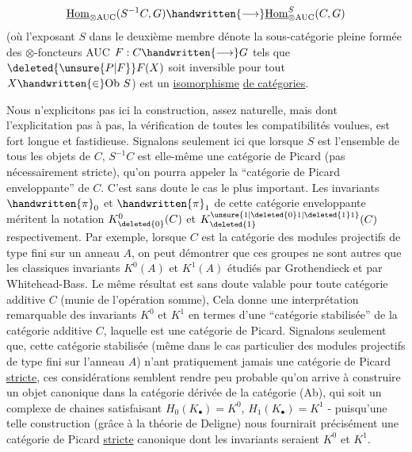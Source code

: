 \[
\underline{\mathrm{Hom}}_{\otimes\mathrm{AUC}}(S^{-1}C,G)\handwritten{\longrightarrow}\underline{\mathrm{Hom}}_{\otimes\mathrm{AUC}}^{S}(C,G)
\]
(où l'exposant $S$ dans le deuxième membre dénote la sous-catégorie pleine formée des $\otimes$-foncteurs AUC $F:C\handwritten{\longrightarrow}G$ tels que $\deleted{\unsure{P|F}}F(X)$ soit inversible pour tout $X\handwritten{\in}\mathrm{Ob}\ S$) est un \uline{isomorphisme} \uline{de catégories}.

Nous n'explicitons pas ici la construction, assez naturelle, mais dont l'explicitation pas à pas,  la vérification de toutes les compatibilités voulues, est fort longue et fastidieuse. Signalons seulement ici que lorsque $S$ est l'ensemble de tous les objets de $C$, $S^{-1}C$ est elle-même une catégorie de Picard (pas nécessairement stricte), qu'on pourra appeler la ``catégorie de Picard enveloppante'' de $C$. C'est sans doute le cas le plus important. Les invariants $\handwritten{\pi}_{0}$ et $\handwritten{\pi}_{1}$ de cette catégorie enveloppante méritent la notation $K^{0}_{\deleted{0}}(C)$ et $K^{\unsure{1|\deleted{0}1|\deleted{1}1}}_{\deleted{1}}(C)$ respectivement. Par exemple, lorsque $C$ est la catégorie des modules projectifs de type fini sur un anneau $A$,  on peut démontrer que ces groupes ne sont autres que les classiques invariants $K^{0}(A)$ et $K^{1}(A)$ étudiés par Grothendieck et par Whitehead-Bass. Le même résultat est sans doute valable pour toute catégorie additive $C$ (munie de  l'opération somme), Cela donne une interprétation remarquable des invariants $K^{0}$ et $K^{1}$ en termes d'une ``catégorie stabilisée'' \handwritten{(}de la catégorie additive $C$\handwritten{)}, laquelle est une catégorie de Picard. Signalons seulement que, cette catégorie stabilisée (même dans le cas particulier des modules projectifs de type fini sur l'anneau $A$) n'ant pratiquement jamais une catégorie de Picard \uline{stricte}, ces considérations semblent rendre peu probable qu'on arrive à construire un objet canonique dans la catégorie dérivée de la catégorie (Ab), qui soit un complexe de chaines satisfaisant $H_{0}(K_{\bullet})=K^{0}$, $H_{1}(K_{\bullet})=K^{1}$ - puisqu'une telle construction (grâce à la théorie de Deligne) nous fournirait précisément une catégorie de Picard \uline{stricte} canonique dont les invariants seraient $K^{0}$ et $K^{1}$.

